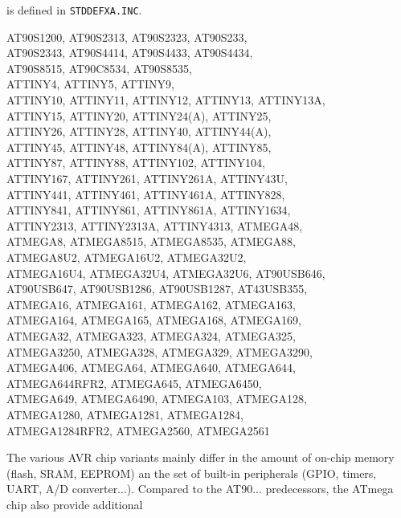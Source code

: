 \documentclass[12pt,twoside]{report}
\newcommand{\tty}[1]{{\tt #1}}
\begin{document}
is defined in \tty{STDDEFXA.INC}.
\begin{cpulist}
   AT90S1200, AT90S2313, AT90S2323, AT90S233,\\
\> AT90S2343, AT90S4414, AT90S4433, AT90S4434,\\
\> AT90S8515, AT90C8534, AT90S8535,\\
\> ATTINY4, ATTINY5, ATTINY9,\\
\> ATTINY10, ATTINY11, ATTINY12, ATTINY13, ATTINY13A,\\
\> ATTINY15, ATTINY20, ATTINY24(A), ATTINY25,\\
\> ATTINY26, ATTINY28, ATTINY40, ATTINY44(A),\\
\> ATTINY45, ATTINY48, ATTINY84(A), ATTINY85,\\
\> ATTINY87, ATTINY88, ATTINY102, ATTINY104,\\
\> ATTINY167, ATTINY261, ATTINY261A, ATTINY43U,\\
\> ATTINY441, ATTINY461, ATTINY461A, ATTINY828,\\
\> ATTINY841, ATTINY861, ATTINY861A, ATTINY1634,\\
\> ATTINY2313, ATTINY2313A, ATTINY4313, ATMEGA48,\\
\> ATMEGA8, ATMEGA8515, ATMEGA8535, ATMEGA88,\\
\> ATMEGA8U2, ATMEGA16U2, ATMEGA32U2,\\
\> ATMEGA16U4, ATMEGA32U4, ATMEGA32U6, AT90USB646,\\
\> AT90USB647, AT90USB1286, AT90USB1287, AT43USB355,\\
\> ATMEGA16, ATMEGA161, ATMEGA162, ATMEGA163,\\
\> ATMEGA164, ATMEGA165, ATMEGA168, ATMEGA169,\\
\> ATMEGA32, ATMEGA323, ATMEGA324, ATMEGA325,\\
\> ATMEGA3250, ATMEGA328, ATMEGA329, ATMEGA3290,\\
\> ATMEGA406, ATMEGA64, ATMEGA640, ATMEGA644,\\
\> ATMEGA644RFR2, ATMEGA645, ATMEGA6450,\\
\> ATMEGA649, ATMEGA6490, ATMEGA103, ATMEGA128,\\
\> ATMEGA1280, ATMEGA1281, ATMEGA1284,\\
\> ATMEGA1284RFR2, ATMEGA2560, ATMEGA2561
\end{cpulist}
The various AVR chip variants mainly differ in the amount of
on-chip memory (flash, SRAM, EEPROM) an the set of built-in
peripherals (GPIO, timers, UART, A/D converter...).  Compared to
the AT90... predecessors, the ATmega chip also provide additional
\end{document}
